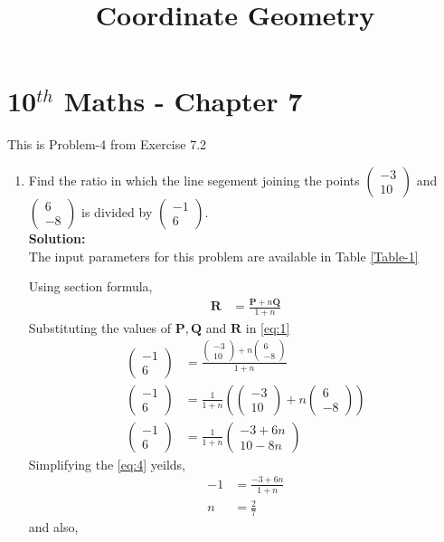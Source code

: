 \documentclass[12pt]{article}
\providecommand{\brak}[1]{\ensuremath{\left(#1\right)}}
\newcommand{\solution}{\noindent \textbf{Solution: }}
\newcommand{\myvec}[1]{\ensuremath{\begin{pmatrix}#1\end{pmatrix}}}
\let\vec\mathbf
\begin{document}
\begin{center}
\title{\textbf{Coordinate Geometry}}
\date{\vspace{-5ex}} %
\maketitle
\end{center}
\setcounter{page}{1}
\section*{10$^{th}$ Maths - Chapter 7}
This is Problem-4 from Exercise 7.2
\begin{enumerate}
\item Find the ratio in which the line segement joining the points $\myvec{-3 \\ 10}$ and $\myvec{6\\-8}$ is divided by $\myvec{-1\\6}$.\\
\solution \\The input parameters for this problem are available in Table \eqref{Table-1}
\begin{table}[ht!]

\caption{}
\label{Table-1} 
\end{table}
Using section formula,
\begin{align}
         \vec{R} &=\frac{\vec{P}+n\vec{Q}}{1+n}\label{eq:1}
\end{align}
Substituting the values of $\vec{P},\vec{Q}$ and $\vec{R}$ in \eqref{eq:1}
\begin{align}
         \myvec{-1\\6} &=\frac{{\myvec{-3\\10}+n\myvec{6\\-8}}}{1+n}\\
         \myvec{-1\\6} &=\frac{1}{1+n}\brak{{\myvec{-3\\10}+n\myvec{6\\-8}}} \\
         \myvec{-1\\6} &=\frac{1}{1+n}\myvec{-3+6n\\10-8n} \label{eq:4}
\end{align}
Simplifying the \eqref{eq:4} yeilds,
\begin{align}
          -1 &=\frac{-3+6n}{1+n}\\
          n &=\frac{2}{7}
\end{align}
and also,

\end{enumerate}
\end{document}
